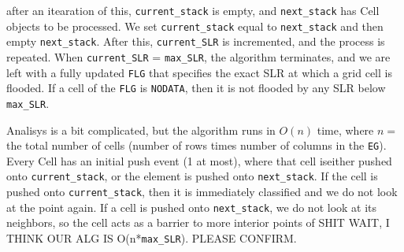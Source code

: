 \documentclass[]{scrartcl}
\begin{document}
\indent after an itearation of this, \texttt{current\_stack} is empty, and \texttt{next\_stack} has Cell objects to be processed. We set \texttt{current\_stack} equal to \texttt{next\_stack} and then empty \texttt{next\_stack}. After this, \texttt{current\_SLR} is incremented, and the process is repeated. When \texttt{current\_SLR} = \texttt{max\_SLR}, the algorithm terminates, and we are left with a fully updated \texttt{FLG} that specifies the exact SLR at which a grid cell is flooded. If a cell of the \texttt{FLG} is \texttt{NODATA}, then it is not flooded by any SLR below \texttt{max\_SLR}.\par
\indent Analisys is a bit complicated, but the algorithm runs in $O(n)$ time, where $n= $ the total number of cells (number of rows times number of columns in the \texttt{EG}). Every Cell has an initial push event (1 at most), where that cell iseither pushed onto \texttt{current\_stack}, or the element is pushed onto \texttt{next\_stack}. If the cell is pushed onto \texttt{current\_stack}, then it is immediately classified and we do not look at the point again. If a cell is pushed onto \texttt{next\_stack}, we do not look at its neighbors, so the cell acts as a barrier to more interior points of SHIT WAIT, I THINK OUR ALG IS O(n*\texttt{max\_SLR}). PLEASE CONFIRM.
\end{document}
